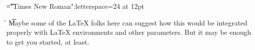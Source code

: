 \font\t="Times New Roman":letterspace=24 at 12pt
 \r\n
\t{Maybe some of the LaTeX folks here can suggest how this would be integrated properly with LaTeX environments and other parameters. But it may be enough to get you started, at least. }


\bye
